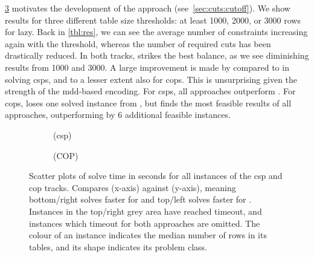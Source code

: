 \documentclass[a4paper,UKenglish,cleveref,autoref,thm-restate]{lipics-v2021}
\begin{document}
\cref{fig:scatter} motivates the development of the \lazyCutoff approach (see~\cref{sec:cuts:cutoff}).
We show results for three different table size thresholds: at least 1000, 2000, or 3000 rows for lazy.
Back in \cref{tbl:res}, we can see the average number of constraints increasing again with the threshold, whereas the number of required cuts has been drastically reduced.
In both tracks,  strikes the best balance, as we see diminishing results from 1000 and 3000.
A large improvement is made by  compared to \lazyAll in solving \glspl{csp}, and to a lesser extent also for \glspl{cop}.
This is unsurprising given the strength of the \gls{mdd}-based encoding.
For \glspl{csp}, all \lazyCutoff approaches outperform \baseMddDomIncr.
For \glspl{cop},  loses one solved instance from \baseMddDomIncr, but finds the most feasible results of all approaches, outperforming \baseGleb by 6 additional feasible instances.


\newcommand{\scatterCaption}{
Scatter plots of solve time in seconds for all instances of the \XCSPYears \gls{csp} and \gls{cop} tracks.
Compares \lazyAll (x-axis) against \baseMddDomIncr (y-axis), meaning bottom/right solves faster for \lazyAll and top/left solves faster for \baseMddDomIncr.
Instances in the top/right grey area have reached timeout, and instances which timeout for both approaches are omitted.
The colour of an instance indicates the median number of rows in its tables, and its shape indicates its problem class.
}

\newcommand{\compare}{base_gurobi-mdd-reduce-dom-incr-nocombined--lazy_gurobi-hybrid_0}

\newcommand{\subfigureWidth}{0.49\linewidth}
\newcommand{\svgWidth}{1.0\linewidth}
\begin{figure}[t]
    \begin{subfigure}{\subfigureWidth}
        \centering
        
        \caption{\XCSPYears (\gls{csp})}
        \label{fig:scatter:csp}
    \end{subfigure}
    \begin{subfigure}{\subfigureWidth}
        \centering
        
        \caption{\XCSPYears (COP)}
        \label{fig:scatter:cop}
    \end{subfigure}
    \caption{\scatterCaption}
    \label{fig:scatter}
\end{figure}
\end{document}
